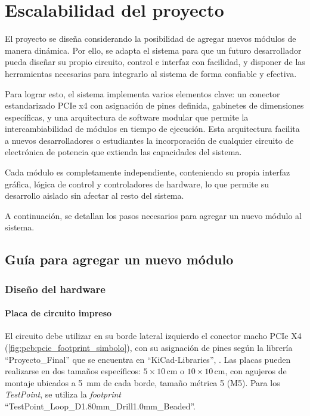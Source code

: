 \section{Escalabilidad del proyecto}

El proyecto se diseña considerando la posibilidad de agregar nuevos módulos de manera dinámica. Por ello, se adapta el sistema para que un futuro desarrollador pueda diseñar su propio circuito, control e interfaz con facilidad, y disponer de las herramientas necesarias para integrarlo al sistema de forma confiable y efectiva. 

Para lograr esto, el sistema implementa varios elementos clave: un conector estandarizado PCIe x4 con asignación de pines definida, gabinetes de dimensiones específicas, y una arquitectura de software modular que permite la intercambiabilidad de módulos en tiempo de ejecución. Esta arquitectura facilita a nuevos desarrolladores o estudiantes la incorporación de cualquier circuito de electrónica de potencia que extienda las capacidades del sistema.

Cada módulo es completamente independiente, conteniendo su propia interfaz gráfica, lógica de control y controladores de hardware, lo que permite su desarrollo aislado sin afectar al resto del sistema.

A continuación, se detallan los pasos necesarios para agregar un nuevo módulo al sistema.

\subsection{Guía para agregar un nuevo módulo}

\subsubsection{Diseño del hardware}

\paragraph{Placa de circuito impreso}

El circuito debe utilizar en su borde lateral izquierdo el conector macho PCIe X4 (\cref{fig:pcb:pcie_footprint_simbolo}), con su asignación de pines según la librería ``Proyecto\_Final'' que se encuentra en ``KiCad-Libraries'', \parencite{git_proyecto}. Las placas pueden realizarse en dos tamaños específicos: $5\times10 \, \unit{\centi\meter}$ o $10\times10 \, \unit{\centi\meter}$, con agujeros de montaje ubicados a \SI{5}{\milli\meter} de cada borde, tamaño métrica 5 (M5). Para los \textit{TestPoint}, se utiliza la \textit{footprint} ``TestPoint\_Loop\_D1.80mm\_Drill1.0mm\_Beaded''.

